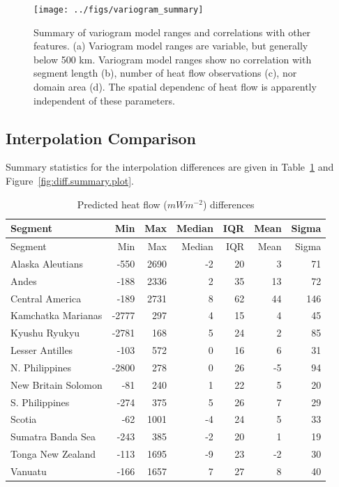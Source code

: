 \documentclass[draft,linenumbers]{agujournal2018}
\begin{document}
\begin{figure}[h]

{\centering \texttt{[image: ../figs/variogram\_summary]} 

}

\caption{Summary of variogram model ranges and correlations with other features. (a) Variogram model ranges are variable, but generally below 500 km. Variogram model ranges show no correlation with segment length (b), number of heat flow observations (c), nor domain area (d). The spatial dependenc of heat flow is apparently independent of these parameters.}\label{fig:variogram.summary.plot}
\end{figure}

\clearpage

\subsection{Interpolation Comparison}

Summary statistics for the interpolation differences are given in
Table~\ref{tbl:diff.summary.table} and
Figure~\ref{fig:diff.summary.plot}.

\hypertarget{tbl:diff.summary.table}{}
\begin{longtable}[]{@{}lrrrrrr@{}}
\caption{\label{tbl:diff.summary.table}Predicted heat flow
(\(mWm^{-2}\)) differences}\tabularnewline
\toprule
Segment & Min & Max & Median & IQR & Mean & Sigma \\
\midrule
\endfirsthead
\toprule
Segment & Min & Max & Median & IQR & Mean & Sigma \\
\midrule
\endhead
Alaska Aleutians & -550 & 2690 & -2 & 20 & 3 & 71 \\
Andes & -188 & 2336 & 2 & 35 & 13 & 72 \\
Central America & -189 & 2731 & 8 & 62 & 44 & 146 \\
Kamchatka Marianas & -2777 & 297 & 4 & 15 & 4 & 45 \\
Kyushu Ryukyu & -2781 & 168 & 5 & 24 & 2 & 85 \\
Lesser Antilles & -103 & 572 & 0 & 16 & 6 & 31 \\
N. Philippines & -2800 & 278 & 0 & 26 & -5 & 94 \\
New Britain Solomon & -81 & 240 & 1 & 22 & 5 & 20 \\
S. Philippines & -274 & 375 & 5 & 26 & 7 & 29 \\
Scotia & -62 & 1001 & -4 & 24 & 5 & 33 \\
Sumatra Banda Sea & -243 & 385 & -2 & 20 & 1 & 19 \\
Tonga New Zealand & -113 & 1695 & -9 & 23 & -2 & 30 \\
Vanuatu & -166 & 1657 & 7 & 27 & 8 & 40 \\
\bottomrule
\end{longtable}
\end{document}
